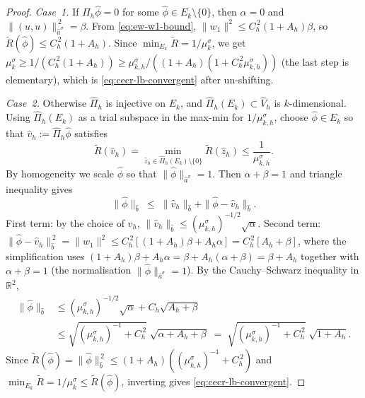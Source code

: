 \documentclass[11pt]{article}
\theoremstyle{plain}
\theoremstyle{definition}
\theoremstyle{remark}
\begin{document}
\begin{proof}
\emph{Case~1.} If $\widehat\Pi_h\widehat\phi=0$ for some
$\widehat\phi\in E_k\setminus\{0\}$, then $\alpha=0$ and
$\|(u,u)\|_{\widehat a^\sigma}^{\,2}=\beta$. From
\eqref{eq:ew-w1-bound},
$\|w_1\|^2\le C_h^{\,2}(1{+}A_h)\beta$, so
$\widetilde R(\widehat\phi)\le C_h^{\,2}(1{+}A_h)$.
Since $\min_{E_k}\widetilde R=1/\mu_k^\sigma$, we get
$\mu_k^\sigma\ge 1/(C_h^{\,2}(1{+}A_h))
\ge\mu_{k,h}^\sigma/((1{+}A_h)(1+C_h^{\,2}\mu_{k,h}^\sigma))$
(the last step is elementary), which is
\eqref{eq:cecr-lb-convergent} after un-shifting.

\emph{Case~2.} Otherwise $\widehat\Pi_h$ is injective on $E_k$,
and $\widehat\Pi_h(E_k)\subset\widehat V_h$ is $k$-dimensional.
Using $\widehat\Pi_h(E_k)$ as a trial subspace in the max-min for
$1/\mu_{k,h}^\sigma$, choose
$\widehat\phi\in E_k$ so that
$\widehat v_h:=\widehat\Pi_h\widehat\phi$ satisfies
\[
  \widetilde R(\widehat v_h)
  =
  \min_{\widehat z_h\in\widehat\Pi_h(E_k)\setminus\{0\}}
  \widetilde R(\widehat z_h)
  \le \frac{1}{\mu_{k,h}^\sigma}.
\]
By homogeneity we scale $\widehat\phi$ so that
$\|\widehat\phi\|_{\widehat a^\sigma}=1$.  Then
$\alpha+\beta=1$ and triangle inequality gives
\[
  \|\widehat\phi\|_{\widehat b}
  \;\le\; \|\widehat v_h\|_{\widehat b}
        + \|\widehat\phi-\widehat v_h\|_{\widehat b}.
\]
First term: by the choice of $\widehat v_h$,
$\|\widehat v_h\|_{\widehat b}\le(\mu_{k,h}^\sigma)^{-1/2}\sqrt{\alpha}$.
Second term: $\|\widehat\phi-\widehat v_h\|_{\widehat b}^{\,2}
=\|w_1\|^2\le C_h^{\,2}[(1{+}A_h)\beta+A_h\alpha]
=C_h^{\,2}[A_h+\beta]$, where the simplification uses
$(1{+}A_h)\beta+A_h\alpha = \beta+A_h(\alpha{+}\beta)=\beta+A_h$
together with $\alpha+\beta=1$ (the normalisation
$\|\widehat\phi\|_{\widehat a^\sigma}=1$).
By the Cauchy--Schwarz inequality in $\mathbb{R}^2$,
\begin{align*}
  \|\widehat\phi\|_{\widehat b}
  &\le (\mu_{k,h}^\sigma)^{-1/2}\sqrt{\alpha}
       + C_h\sqrt{A_h+\beta} \\
  &\le \sqrt{(\mu_{k,h}^\sigma)^{-1}+C_h^{\,2}}
       \;\sqrt{\alpha+A_h+\beta}
  \;=\; \sqrt{(\mu_{k,h}^\sigma)^{-1}+C_h^{\,2}}
       \;\sqrt{1+A_h}.
\end{align*}
Since $\widetilde R(\widehat\phi)
=\|\widehat\phi\|_{\widehat b}^{\,2}
\le(1{+}A_h)((\mu_{k,h}^\sigma)^{-1}+C_h^{\,2})$
and $\min_{E_k}\widetilde R=1/\mu_k^\sigma\le\widetilde R(\widehat\phi)$,
inverting gives
\eqref{eq:cecr-lb-convergent}.
\end{proof}
\end{document}
